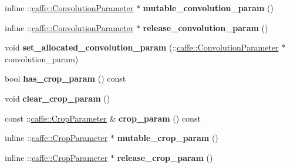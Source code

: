 \begin{DoxyCompactItemize}
inline \+::\mbox{\hyperlink{classcaffe_1_1_convolution_parameter}{caffe\+::\+Convolution\+Parameter}} $\ast$ {\bfseries mutable\+\_\+convolution\+\_\+param} ()
\item 
\mbox{\label{classcaffe_1_1_layer_parameter_acb966a316326c5ef1b7a35ddeed38020}} 
inline \+::\mbox{\hyperlink{classcaffe_1_1_convolution_parameter}{caffe\+::\+Convolution\+Parameter}} $\ast$ {\bfseries release\+\_\+convolution\+\_\+param} ()
\item 
\mbox{\label{classcaffe_1_1_layer_parameter_a87c78eeda270674b91e2dca5ffca2137}} 
void {\bfseries set\+\_\+allocated\+\_\+convolution\+\_\+param} (\+::\mbox{\hyperlink{classcaffe_1_1_convolution_parameter}{caffe\+::\+Convolution\+Parameter}} $\ast$convolution\+\_\+param)
\item 
\mbox{\label{classcaffe_1_1_layer_parameter_ad4dd33af1b90abd1c1300a9766a776fb}} 
bool {\bfseries has\+\_\+crop\+\_\+param} () const
\item 
\mbox{\label{classcaffe_1_1_layer_parameter_a21f7d51e72825703a1f1d158c7468d67}} 
void {\bfseries clear\+\_\+crop\+\_\+param} ()
\item 
\mbox{\label{classcaffe_1_1_layer_parameter_a8ef8c5ff4bdc2e1eeb85bac9bc9d5bd6}} 
const \+::\mbox{\hyperlink{classcaffe_1_1_crop_parameter}{caffe\+::\+Crop\+Parameter}} \& {\bfseries crop\+\_\+param} () const
\item 
\mbox{\label{classcaffe_1_1_layer_parameter_a7ff646df215ef91806ddd7d0de7e2448}} 
inline \+::\mbox{\hyperlink{classcaffe_1_1_crop_parameter}{caffe\+::\+Crop\+Parameter}} $\ast$ {\bfseries mutable\+\_\+crop\+\_\+param} ()
\item 
\mbox{\label{classcaffe_1_1_layer_parameter_a0913e5e3d2f576c054f1813b53b5e9e7}} 
inline \+::\mbox{\hyperlink{classcaffe_1_1_crop_parameter}{caffe\+::\+Crop\+Parameter}} $\ast$ {\bfseries release\+\_\+crop\+\_\+param} ()
\item 
\mbox{\label{classcaffe_1_1_layer_parameter_a590a2600a71df0867ec78be9bc3f83e5}} 

\end{DoxyCompactItemize}
